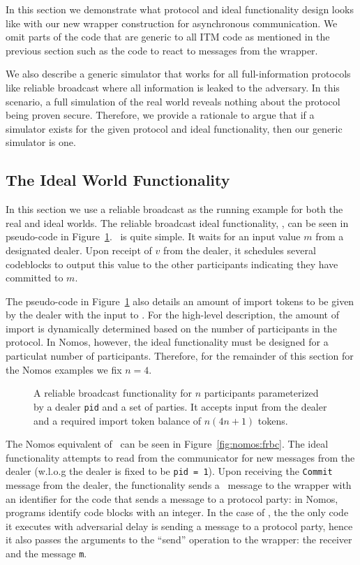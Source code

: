 In this section we demonstrate what protocol and ideal functionality design looks like with our new wrapper construction for asynchronous communication.
We omit parts of the code that are generic to all ITM code as mentioned in the previous section such as the code to react to \Exec messages from the wrapper.

We also describe a generic simulator that works for all full-information protocols like reliable broadcast where all information is leaked to the adversary.
In this scenario, a full simulation of the real world reveals nothing about the protocol being proven secure. 
Therefore, we provide a rationale to argue that if a simulator exists for the given protocol and ideal functionality, then our generic simulator is one.

\subsection{The Ideal World Functionality \Frbc}
In this section we use a reliable broadcast as the running example for both the real and ideal worlds.
The reliable broadcast ideal functionality, \Frbc, can be seen in pseudo-code in Figure~\ref{fig:frbc}.
\Frbc~is quite simple.
It waits for an input value $m$ from a designated dealer. 
Upon receipt of $v$ from the dealer, it schedules several codeblocks to \Eventually output this value to the other participants indicating they have committed to $m$.

The pseudo-code in Figure~\ref{fig:frbc} also details an amount of import tokens to be given by the dealer with the input to \Frbc.
For the high-level description, the amount of import is dynamically determined based on the number of participants in the protocol.
In Nomos, however, the ideal functionality must be designed for a particulat number of participants.
Therefore, for the remainder of this section for the Nomos examples we fix $n=4$.

\begin{figure}

\caption{A reliable broadcast functionality for $n$ participants parameterized by a dealer \texttt{pid} and a set of parties. It accepts input from the dealer and a required import token balance of $n(4n + 1)$ tokens.}
\label{fig:frbc}
\end{figure}

The Nomos equivalent of \Frbc~can be seen in Figure~\ref{fig:nomos:frbc}.
The ideal functionality attempts to read from the communicator for new messages from the dealer (w.l.o.g the dealer is fixed to be \texttt{pid = 1}).
Upon receiving the \texttt{Commit} message from the dealer, the functionality sends a \Schedule~message to the wrapper with an identifier for the code that sends a message to a protocol party: in Nomos, programs identify code blocks with an integer. 
In the case of \Frbc, the the only code it executes with adversarial delay is sending a message to a protocol party, hence it also passes the arguments to the ``send'' operation to the wrapper: the receiver and the message \texttt{m}.

